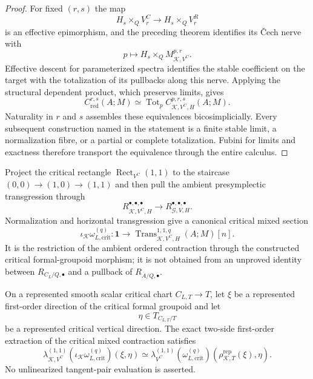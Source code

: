 \begin{proof}
For fixed $(r,s)$ the map
\[
H_s\times_QV^C_r
\longrightarrow
H_s\times_QV^R_r
\]
is an effective epimorphism, and the preceding theorem identifies its \v{C}ech nerve
with
\[
p\longmapsto H_s\times_QM_{\mathcal K,V^C}^{p,r}.
\]
Effective descent for parameterized spectra identifies the stable coefficient on
the target with the totalization of its pullbacks along this nerve.  Applying the
structural dependent product, which preserves limits, gives
\[
C_{\mathrm{red}}^{r,s}(A;M)
\simeq
\operatorname{Tot}_p
C_{\mathcal K,V^C,H}^{p,r,s}(A;M).
\]
Naturality in $r$ and $s$ assembles these equivalences bicosimplicially.  Every
subsequent construction named in the statement is a finite stable limit, a
normalization fibre, or a partial or complete totalization.  Fubini for limits and
exactness therefore transport the equivalence through the entire calculus.
\end{proof}

\begin{construction}
\label{constr:symmetry-noether-critical-ordered-presymplectic-contraction}
Project the critical rectangle $\operatorname{Rect}_{V^C}(1,1)$ to the staircase
$(0,0)\to(1,0)\to(1,1)$ and then pull the ambient presymplectic transgression
through
\[
R_{\mathcal K,V^C,H}^{\bullet,\bullet,\bullet}
\longrightarrow
R_{\mathcal G,V,H}^{\bullet,\bullet,\bullet}.
\]
Normalization and horizontal transgression give a canonical critical mixed section
\[
\boxed{
\iota_{\mathcal K}\omega_{L,\mathrm{crit}}^{(q)}
:
\mathbf1
\longrightarrow
\operatorname{Trans}_{\mathcal K,V^C,H}^{1,1,q}(A;M)[n].
}
\]
It is the restriction of the ambient ordered contraction through the constructed
critical formal-groupoid morphism; it is not obtained from an unproved identity
between $R_{C_L/Q,\bullet}$ and a pullback of
$R_{\overline A/Q,\bullet}$.
\end{construction}

\begin{theorem}
\label{thm:symmetry-noether-represented-critical-contraction-recognition}
On a represented smooth scalar critical chart $C_{L,T}\to T$, let $\xi$ be a
represented first-order direction of the critical formal groupoid and let
\[
\eta\in T_{C_{L,T}/T}
\]
be a represented critical vertical direction.  The exact two-side first-order
extraction of the critical mixed contraction satisfies
\[
\boxed{
\lambda_{\mathcal K,V^C}^{(1,1)}
\left(\iota_{\mathcal K}\omega_{L,\mathrm{crit}}^{(q)}\right)(\xi,\eta)
\simeq
\lambda_{V^C}^{(1,1)}
\left(\omega_{L,\mathrm{crit}}^{(q)}\right)
\left(\rho_{\mathcal K,T}^{\mathrm{rep}}(\xi),\eta\right).
}
\]
No unlinearized tangent-pair evaluation is asserted.
\end{theorem}


